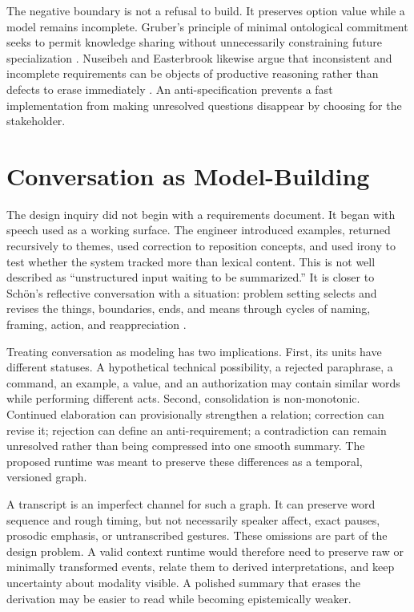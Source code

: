 \documentclass[10pt,a4paper]{article}
\begin{document}
The negative boundary is not a refusal to build. It preserves option value while a model remains incomplete. Gruber's principle of minimal ontological commitment seeks to permit knowledge sharing without unnecessarily constraining future specialization \cite{gruber1995}. Nuseibeh and Easterbrook likewise argue that inconsistent and incomplete requirements can be objects of productive reasoning rather than defects to erase immediately \cite{nuseibeh2000}. An anti-specification prevents a fast implementation from making unresolved questions disappear by choosing for the stakeholder.

\section{Conversation as Model-Building}

The design inquiry did not begin with a requirements document. It began with speech used as a working surface. The engineer introduced examples, returned recursively to themes, used correction to reposition concepts, and used irony to test whether the system tracked more than lexical content. This is not well described as ``unstructured input waiting to be summarized.'' It is closer to Sch\"on's reflective conversation with a situation: problem setting selects and revises the things, boundaries, ends, and means through cycles of naming, framing, action, and reappreciation \cite{schon1983,schon1992}.

Treating conversation as modeling has two implications. First, its units have different statuses. A hypothetical technical possibility, a rejected paraphrase, a command, an example, a value, and an authorization may contain similar words while performing different acts. Second, consolidation is non-monotonic. Continued elaboration can provisionally strengthen a relation; correction can revise it; rejection can define an anti-requirement; a contradiction can remain unresolved rather than being compressed into one smooth summary. The proposed runtime was meant to preserve these differences as a temporal, versioned graph.

A transcript is an imperfect channel for such a graph. It can preserve word sequence and rough timing, but not necessarily speaker affect, exact pauses, prosodic emphasis, or untranscribed gestures. These omissions are part of the design problem. A valid context runtime would therefore need to preserve raw or minimally transformed events, relate them to derived interpretations, and keep uncertainty about modality visible. A polished summary that erases the derivation may be easier to read while becoming epistemically weaker.
\end{document}
